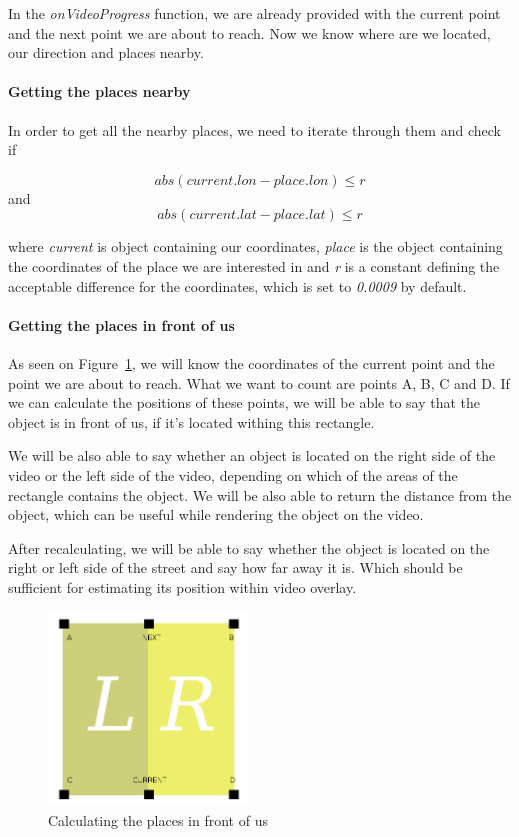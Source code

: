 \documentclass[journal]{IEEEtran}
\begin{document}
	In the \textit{onVideoProgress} function, we are already provided with the current point and the next point we are about to reach. Now we know where are we located, our direction and places nearby.

\paragraph{Getting the places nearby}

In order to get all the nearby places, we need to iterate through them and check if 


\begin{displaymath}
abs(current.lon - place.lon) \leq r
\end{displaymath}
and
\begin{displaymath}
abs(current.lat - place.lat) \leq r
\end{displaymath}

 where \textit{current} is object containing our coordinates, \textit{place} is the object containing the coordinates of the place we are interested in and \textit{r} is a constant defining the acceptable difference for the coordinates, which is set to \textit{0.0009} by default.

\paragraph{Getting the places in front of us}

As seen on Figure~\ref{filtering}, we will know the coordinates of the current point and the point we are about to reach. What we want to count are points A, B, C and D. If we can calculate the positions of these points, we will be able to say that the object is in front of us, if it's located withing this rectangle.

We will be also able to say whether an object is located on the right side of the video or the left side of the video, depending on which of the areas of the rectangle contains the object. We will be also able to return the distance from the object, which can be useful while rendering the object on the video.

After recalculating, we will be able to say whether the object is located on the right or left side of the street and say how far away it is. Which should be sufficient for estimating its position within video overlay.

        \begin{figure}[htb]
         \centering
         \includegraphics[width=200px]{filtering}
         \caption{Calculating the places in front of us}
         \label{filtering}
        \end{figure}
        
\end{document}
